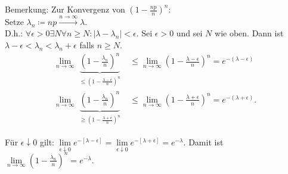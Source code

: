 \documentclass{tstextbook}
\begin{document}
\begin{remark}
	Bemerkung: Zur Konvergenz von $ \left(1-\frac{np}{n}\right)^n $: \\
	Setze $ \lambda_n \coloneqq np \overset{n\to \infty}{\longrightarrow} \lambda $. \\
	D.h.: $ \forall \epsilon > 0 \exists N \forall n \ge N: |\lambda - \lambda_n| < \epsilon $. Sei $ \epsilon > 0 $ und sei $ N $ wie oben. Dann ist $ \lambda - \epsilon < \lambda_n < \lambda_n + \epsilon $ falls $ n \ge N $.
	\[
	\begin{aligned}
		\lim\limits_{n \to \infty} \underbrace{\left( 1- \frac{\lambda_n}{n} \right)^n}_{\substack{\le \left(1-\frac{\lambda-\epsilon}{n}\right)^n}} & \le \lim\limits_{n \to \infty} \left( 1- \frac{\lambda - \epsilon}{n} \right)^n = e^{-(\lambda - \epsilon)} \\
		\lim\limits_{n \to \infty} \underbrace{\left( 1- \frac{\lambda_n}{n} \right)^n}_{\substack{\ge \left(1-\frac{\lambda+\epsilon}{n}\right)^n}} & \le \lim\limits_{n \to \infty} \left( 1- \frac{\lambda + \epsilon}{n} \right)^n = e^{-(\lambda + \epsilon)}.
	\end{aligned}
	\]
	
	Für $ \epsilon \downarrow 0 $ gilt: $ \lim\limits_{\epsilon \downarrow 0} e^{-[\lambda - \epsilon]} = \lim\limits_{\epsilon \downarrow 0} e^{-[\lambda + \epsilon]} = e^{-\lambda}$. 
	Damit ist $ \lim\limits_{n \to \infty} \left(1- \frac{\lambda_n}{n}\right)^n = e^{-\lambda} $.
\end{remark}
\end{document}
